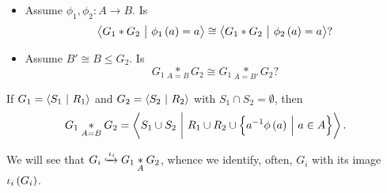 \begin{exercise}
\hfill
\begin{itemize}
\item Assume $ \phi_1, \phi_2 : A \to B $. Is
$$ \abr{G_1 * G_2 \st \phi_1\br{a} = a} \cong \abr{G_1 * G_2 \st \phi_2\br{a} = a}? $$
\item Assume $ B' \cong B \le G_2 $. Is
$$ G_1 \underset{A = B}{*} G_2 \cong G_1 \underset{A = B'}{*} G_2? $$
\end{itemize}
\end{exercise}

\begin{exercise}
\label{ex:2.2.4}
If $ G_1 = \left\langle S_1 \ \middle| \  R_1 \right\rangle $ and $ G_2 = \left\langle S_2 \ \middle| \  R_2 \right\rangle $ with $ S_1 \cap S_2 = \emptyset $, then
$$ G_1 \underset{A = B}{*} G_2 = \abr{S_1 \cup S_2 \st R_1 \cup R_2 \cup \cbr{a^{-1}\phi\br{a} \st a \in A}}. $$
\end{exercise}

We will see that $ G_i \xhookrightarrow{\iota_i} G_1 \underset{A}{*} G_2 $, whence we identify, often, $ G_i $ with its image $ \iota_i\br{G_i} $.

\pagebreak

